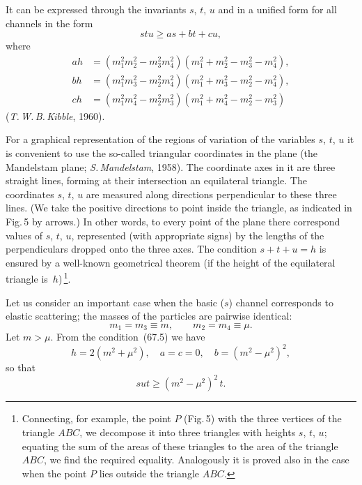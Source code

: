 It can be expressed through the invariants $s$, $t$, $u$ and in a unified form for all channels in the form
\begin{equation}
stu \geqslant as + bt + cu,
\tag{67.5}
\end{equation}
where
\begin{equation}
\begin{aligned}
ah &= (m^2_1 m^2_2 - m^2_3 m^2_4)(m^2_1 + m^2_2 - m^2_3 - m^2_4),\\[3pt]
bh &= (m^2_1 m^2_3 - m^2_2 m^2_4)(m^2_1 + m^2_3 - m^2_2 - m^2_4),\\[3pt]
ch &= (m^2_1 m^2_4 - m^2_2 m^2_3)(m^2_1 + m^2_4 - m^2_2 - m^2_3)
\end{aligned}
\tag{67.6}
\end{equation}
(\textit{T.\,W.\,B.\,Kibble}, 1960).

For a graphical representation of the regions of variation of the variables $s$, $t$, $u$ it is convenient to use the so-called triangular coordinates in the plane (the Mandelstam plane; \textit{S.\,Mandelstam}, 1958). The coordinate axes in it are three straight lines, forming at their intersection an equilateral triangle. The coordinates $s$, $t$, $u$ are measured along directions perpendicular to these three lines. (We take the positive directions to point inside the triangle, as indicated in Fig.\,5 by arrows.) In other words, to every point of the plane there correspond values of $s$, $t$, $u$, represented (with appropriate signs) by the lengths of the perpendiculars dropped onto the three axes. The condition $s + t + u = h$ is ensured by a well-known geometrical theorem (if the height of the equilateral triangle is~$h$)\,\footnote{Connecting, for example, the point $P$ (Fig.\,5) with the three vertices of the triangle $ABC$, we decompose it into three triangles with heights $s$, $t$, $u$; equating the sum of the areas of these triangles to the area of the triangle $ABC$, we find the required equality. Analogously it is proved also in the case when the point $P$ lies outside the triangle $ABC$.}.

Let us consider an important case when the basic ($s$) channel corresponds to elastic scattering; the masses of the particles are pairwise identical:
\begin{equation}
m_1 = m_3 \equiv m,\qquad m_2 = m_4 \equiv \mu.
\tag{67.7}
\end{equation}
Let $m > \mu$. From the condition~(67.5) we have
\[
h = 2(m^2 + \mu^2),\quad a = c = 0,\quad b = (m^2 - \mu^2)^2,
\]
so that
\begin{equation}
sut \geqslant (m^2 - \mu^2)^2\,t.
\tag{67.8}
\end{equation}

